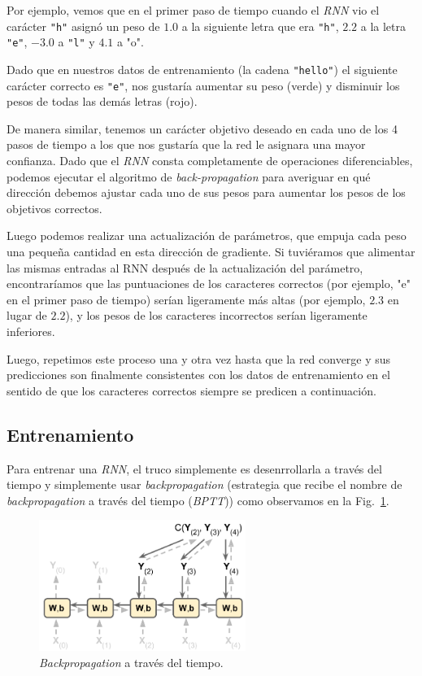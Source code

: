 \documentclass[a4paper,12pt]{article}
\begin{document}
Por ejemplo, vemos que en el primer paso de tiempo cuando el \textit{RNN} vio el carácter \texttt{"h"} asignó un peso de $1.0$ a la siguiente letra que era \texttt{"h"}, $2.2$ a la letra \texttt{"e"}, $-3.0$ a \texttt{"l"} y $4.1$ a "o". 

\clearpage

Dado que en nuestros datos de entrenamiento (la cadena \texttt{"hello"}) el siguiente carácter correcto es \texttt{"e"}, nos gustaría aumentar su peso (verde) y disminuir los pesos de todas las demás letras (rojo). 

De manera similar, tenemos un carácter objetivo deseado en cada uno de los 4 pasos de tiempo a los que nos gustaría que la red le asignara una mayor confianza. Dado que el \textit{RNN} consta completamente de operaciones diferenciables, podemos ejecutar el algoritmo de \textit{back-propagation} para averiguar en qué dirección debemos ajustar cada uno de sus pesos para aumentar los pesos de los objetivos correctos. 

Luego podemos realizar una actualización de parámetros, que empuja cada peso una pequeña cantidad en esta dirección de gradiente. Si tuviéramos que alimentar las mismas entradas al RNN después de la actualización del parámetro, encontraríamos que las puntuaciones de los caracteres correctos (por ejemplo, "e" en el primer paso de tiempo) serían ligeramente más altas (por ejemplo, $2.3$ en lugar de $2.2$), y los pesos de los caracteres incorrectos serían ligeramente inferiores.

Luego, repetimos este proceso una y otra vez hasta que la red converge y sus predicciones son finalmente consistentes con los datos de entrenamiento en el sentido de que los caracteres correctos siempre se predicen a continuación.

\subsection{Entrenamiento}
Para entrenar una \textit{RNN}, el truco simplemente es desenrrollarla a través del tiempo y simplemente usar \textit{backpropagation} (estrategia que recibe el nombre de \textit{backpropagation} a través del tiempo (\textit{BPTT})) como observamos en la Fig.~\ref{fig:BPTT}.

\begin{figure}[H]
	\begin{center}				
		\includegraphics[width=0.6\textwidth]{tesis_40.png}
		\caption{\textit{Backpropagation} a través del tiempo.\citep{geron}}
		\label{fig:BPTT}
	\end{center}
\end{figure}
\end{document}
